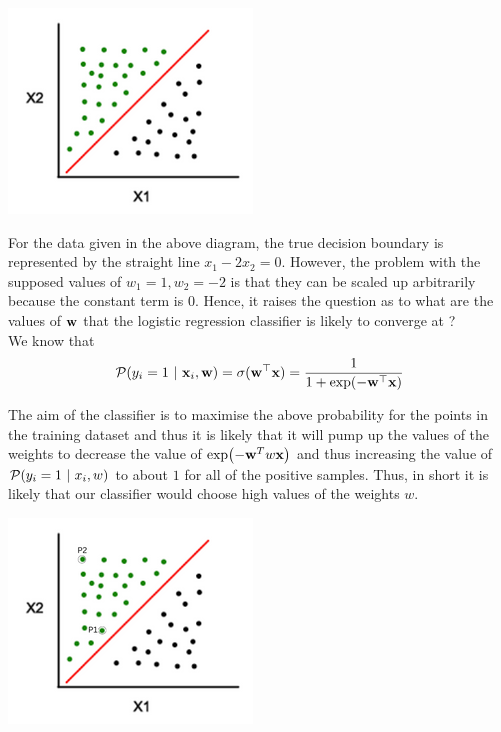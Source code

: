 \begin{center}
  \includegraphics[scale=0.8]{images/05_04.png}
\end{center}

For the data given in the above diagram, the true decision boundary is represented by the straight line $x_1 - 2x_2 = 0$. However, the problem with the supposed values of $w_1 = 1, w_2 = -2$ is that they can be scaled up arbitrarily because the constant term is $0$. Hence, it raises the question as to what are the values of $\textbf{w}$ that the logistic regression classifier is likely to converge at ? \\

We know that
$$
  \mathcal{P}(y_i = 1 \ | \  \textbf{x}_i, \textbf{w}) = \sigma(\textbf{w}^\top \textbf{x}) = \frac{1}{1+\exp(-\textbf{w}^\top \textbf{x})}
$$

The aim of the classifier is to maximise the above probability for the points in the training dataset and thus it is likely that it will pump up the values of the weights to decrease the value of $\exp(-\textbf{w}^Tw\textbf{x})$ and thus increasing the value of $\mathcal{P}(y_i = 1 \ | \  x_i,w)$ to about $1$ for all of the positive samples. Thus, in short it is likely that our classifier would choose high values of the weights $w$. \\


\begin{center}
  \includegraphics[scale=0.8]{images/05_05.png}
\end{center}

